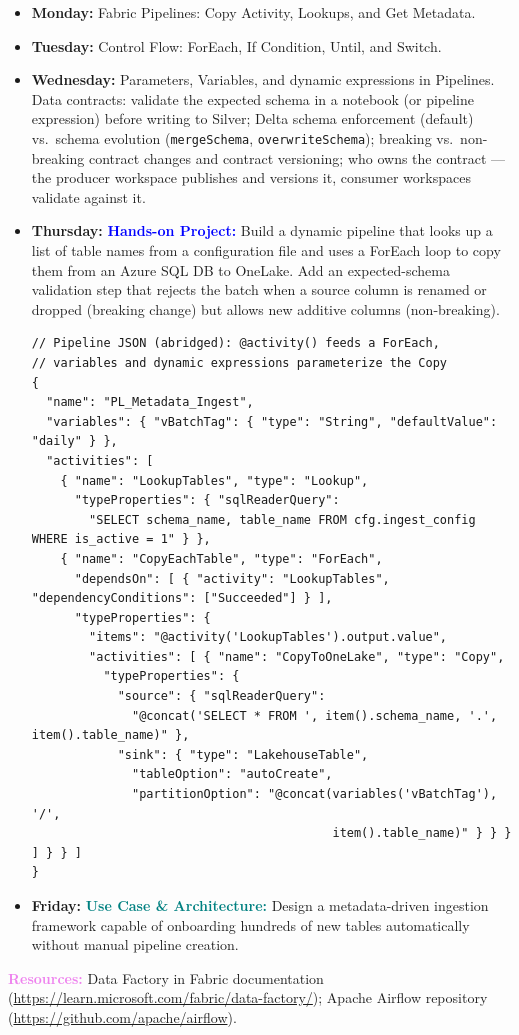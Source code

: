 \documentclass[11pt, a4paper]{article}
\newcommand{\project}[1]{\vspace{1mm}\noindent\textbf{\textcolor{blue}{Hands-on Project:}} #1}
\newcommand{\usecase}[1]{\vspace{1mm}\noindent\textbf{\textcolor{teal}{Use Case \& Architecture:}} #1}
\newcommand{\dayitem}[2]{\item \textbf{#1:} #2}
\newcommand{\resources}[1]{\vspace{1mm}\noindent\textbf{\textcolor{violet}{Resources:}} #1}
\begin{document}
\begin{itemize}[label=-]
    \dayitem{Monday}{Fabric Pipelines: Copy Activity, Lookups, and Get Metadata.}
    \dayitem{Tuesday}{Control Flow: ForEach, If Condition, Until, and Switch.}
    \dayitem{Wednesday}{Parameters, Variables, and dynamic expressions in Pipelines. Data contracts: validate the expected schema in a notebook (or pipeline expression) before writing to Silver; Delta schema enforcement (default) vs.\ schema evolution (\texttt{mergeSchema}, \texttt{overwriteSchema}); breaking vs.\ non-breaking contract changes and contract versioning; who owns the contract --- the producer workspace publishes and versions it, consumer workspaces validate against it.}
    \dayitem{Thursday}{\project{Build a dynamic pipeline that looks up a list of table names from a configuration file and uses a ForEach loop to copy them from an Azure SQL DB to OneLake. Add an expected-schema validation step that rejects the batch when a source column is renamed or dropped (breaking change) but allows new additive columns (non-breaking).}}
\begin{lstlisting}
// Pipeline JSON (abridged): @activity() feeds a ForEach,
// variables and dynamic expressions parameterize the Copy
{
  "name": "PL_Metadata_Ingest",
  "variables": { "vBatchTag": { "type": "String", "defaultValue": "daily" } },
  "activities": [
    { "name": "LookupTables", "type": "Lookup",
      "typeProperties": { "sqlReaderQuery":
        "SELECT schema_name, table_name FROM cfg.ingest_config WHERE is_active = 1" } },
    { "name": "CopyEachTable", "type": "ForEach",
      "dependsOn": [ { "activity": "LookupTables", "dependencyConditions": ["Succeeded"] } ],
      "typeProperties": {
        "items": "@activity('LookupTables').output.value",
        "activities": [ { "name": "CopyToOneLake", "type": "Copy",
          "typeProperties": {
            "source": { "sqlReaderQuery":
              "@concat('SELECT * FROM ', item().schema_name, '.', item().table_name)" },
            "sink": { "type": "LakehouseTable",
              "tableOption": "autoCreate",
              "partitionOption": "@concat(variables('vBatchTag'), '/',
                                          item().table_name)" } } } ] } } ]
}
\end{lstlisting}
    \dayitem{Friday}{\usecase{Design a metadata-driven ingestion framework capable of onboarding hundreds of new tables automatically without manual pipeline creation.}}
\end{itemize}
\resources{Data Factory in Fabric documentation (\url{https://learn.microsoft.com/fabric/data-factory/}); Apache Airflow repository (\url{https://github.com/apache/airflow}).}
\end{document}
